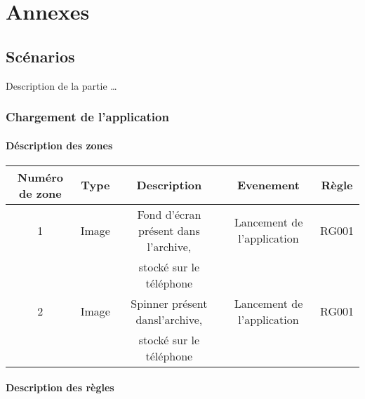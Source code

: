 \documentclass{report}
\begin{document}
\chapter{Annexes}

	\section{Scénarios}
	
		Description de la partie \ldots
		
		\newpage

\newpage
	
	\subsection{Chargement de l'application}
	
		\hypertarget{Chargement de l'application}{}
		\label{Chargement de l'application}

		
		
		\subsubsection{Déscription des zones}

			\begin{tabular}{|c|c|c|c|c|} \hline
				Numéro de zone & Type  & Description & Evenement &	Règle \\\hline 
				1 & Image & Fond d'écran présent dans l'archive, &Lancement de l'application &RG001\\\ 
				 &  & stocké sur le téléphone &	&\\\hline
				2 & Image & Spinner présent dansl'archive, & Lancement de l'application &	RG001\\
				 & & stocké sur le téléphone & &\\\hline
			\end{tabular}
		
		\subsubsection{Description des règles}
		
\end{document}
